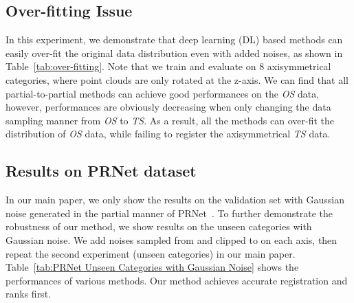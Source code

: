 \documentclass[10pt,twocolumn,letterpaper]{article}
\begin{document}
\subsection{Over-fitting Issue}
\label{sec:3.1}
In this experiment, we demonstrate that deep learning (DL) based methods can easily over-fit the original data distribution even with added noises, as shown in Table~\ref{tab:over-fitting}. Note that we train and evaluate on 8 axisymmetrical categories, where point clouds are only rotated at the z-axis. We can find that all partial-to-partial methods can achieve good performances on the \emph{OS} data, however, performances are obviously decreasing when only changing the data sampling manner from \emph{OS} to \emph{TS}. As a result, all the methods can over-fit the distribution of \emph{OS} data, while failing to register the axisymmetrical \emph{TS} data.

\subsection{Results on PRNet dataset}
\label{sec:3.2}
In our main paper, we only show the results on the validation set with Gaussian noise generated in the partial manner of PRNet~\cite{wang2019prnet}. To further demonstrate the robustness of our method, we show results on the unseen categories with Gaussian noise. We add noises sampled from  and clipped to  on each axis, then repeat the second experiment (unseen categories) in our main paper. Table~\ref{tab:PRNet Unseen Categories with Gaussian Noise} shows the performances of various methods. Our method achieves accurate registration and ranks first.
\end{document}
